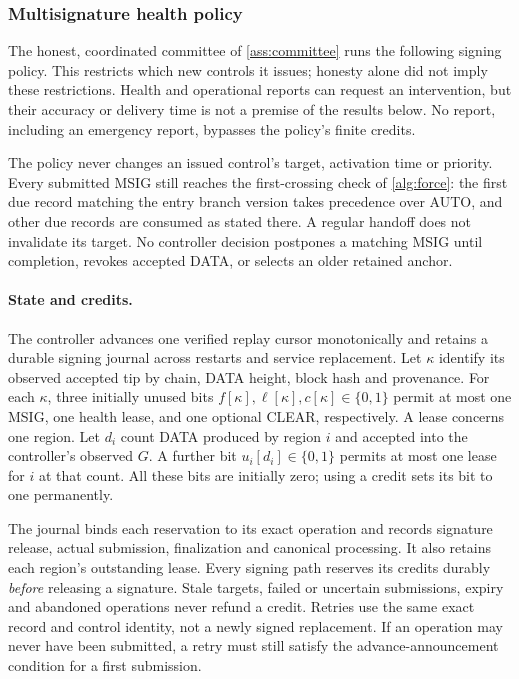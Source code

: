 \subsubsection{Multisignature health policy}
\label{sec:health-policy}
The honest, coordinated committee of \cref{ass:committee} runs the
following signing policy. This restricts which new controls it issues;
honesty alone did not imply these restrictions. Health and operational
reports can request an intervention, but their accuracy or delivery time
is not a premise of the results below. No report, including an emergency
report, bypasses the policy's finite credits.

The policy never changes an issued control's target, activation time or
priority. Every submitted MSIG still reaches the first-crossing check of
\cref{alg:force}: the first due record matching the entry branch version
takes precedence over AUTO, and other due records are consumed as stated
there. A regular handoff does not invalidate its target. No controller
decision postpones a matching MSIG until completion, revokes accepted
DATA, or selects an older retained anchor.

\paragraph{State and credits.}
The controller advances one verified replay cursor monotonically and
retains a durable signing journal across restarts and service replacement.
Let $\kappa$ identify its observed accepted tip by chain, DATA height,
block hash and provenance. For each $\kappa$, three initially unused bits
$f[\kappa],\ell[\kappa],c[\kappa]\in\{0,1\}$ permit at most one MSIG,
one health lease, and one optional CLEAR, respectively. A lease concerns
one region. Let $d_i$ count DATA produced by region $i$ and accepted into
the controller's observed $G$. A further bit $u_i[d_i]\in\{0,1\}$ permits
at most one lease for $i$ at that count. All these bits are initially zero;
using a credit sets its bit to one permanently.

The journal binds each reservation to its exact operation and records
signature release, actual submission, finalization and canonical
processing. It also retains each region's outstanding lease. Every
signing path reserves its credits durably \emph{before} releasing a
signature. Stale targets, failed or uncertain submissions, expiry and
abandoned operations never refund a credit. Retries use the same exact
record and control identity, not a newly signed replacement. If an
operation may never have been submitted, a retry must still satisfy the
advance-announcement condition for a first submission.

